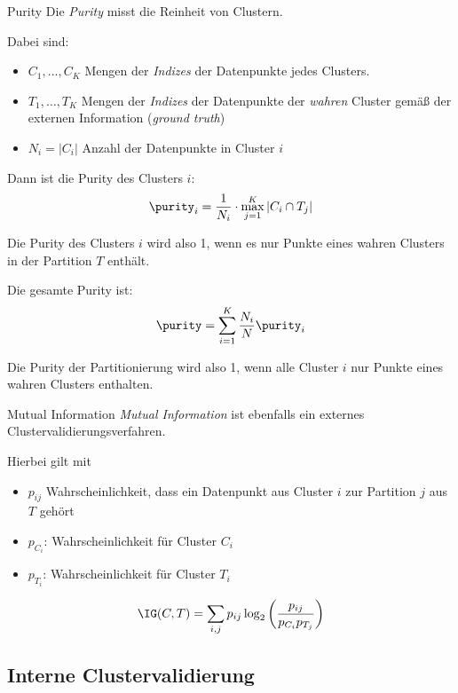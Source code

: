 \begin{defi}{Purity}
    Die \emph{Purity} misst die Reinheit von Clustern.

    Dabei sind:
    \begin{itemize}
        \item $C_1, \ldots, C_K$ Mengen der \emph{Indizes} der Datenpunkte jedes Clusters.
        \item $T_1, \ldots, T_K$ Mengen der \emph{Indizes} der Datenpunkte der \emph{wahren} Cluster gemäß der externen Information (\emph{ground truth})
        \item $N_i = |C_i|$ Anzahl der Datenpunkte in Cluster $i$
    \end{itemize}

    Dann ist die Purity des Clusters $i$:
    \[
        \purity_i = \frac{1}{N_i} \cdot \max_{j=1}^{K} |C_i \cap T_j|
    \]

    Die Purity des Clusters $i$ wird also 1, wenn es nur Punkte eines wahren Clusters in der Partition $T$ enthält.

    Die gesamte Purity ist:
    \[
        \purity = \sum_{i=1}^{K} \frac{N_i}{N} \purity_i
    \]

    Die Purity der Partitionierung wird also 1, wenn alle Cluster $i$ nur Punkte eines wahren Clusters enthalten.
\end{defi}

\begin{bonus}{Mutual Information}
    \emph{Mutual Information} ist ebenfalls ein externes Clustervalidierungsverfahren.

    Hierbei gilt mit
    \begin{itemize}
        \item $p_{ij}$ Wahrscheinlichkeit, dass ein Datenpunkt aus Cluster $i$ zur Partition $j$ aus $T$ gehört
        \item $p_{C_i}$: Wahrscheinlichkeit für Cluster $C_i$
        \item $p_{T_i}$: Wahrscheinlichkeit für Cluster $T_i$
    \end{itemize}
    \[
        \IG(C, T) = \sum_{i, j} p_{ij} \log_2 \left(\frac{p_{ij}}{p_{C_i} p_{T_j}}\right)
    \]
\end{bonus}

\subsection{Interne Clustervalidierung}

